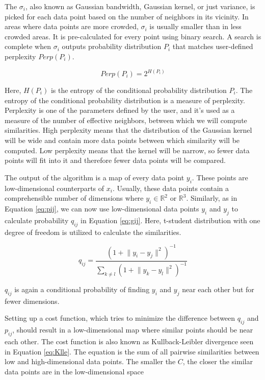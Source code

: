 The $\sigma_i$, also known as Gaussian bandwidth, Gaussian kernel, or just variance, is picked for each data point based on the number of neighbors in its vicinity.
In areas where data points are more crowded, $\sigma_i$ is usually smaller than in less crowded areas.
It is pre-calculated for every point using binary search.
A search is complete when $\sigma_i$ outputs probability distribution $P_i$ that matches user-defined perplexity $Perp(P_i)$.

$$Perp(P_i) = 2^{H(P_i)}$$

Here, $H(P_i)$ is the entropy of the conditional probability distribution $P_i$.
The entropy of the conditional probability distribution is a measure of perplexity.
Perplexity is one of the parameters defined by the user, and it's used as a measure of the number of effective neighbors, between which we will compute similarities.
High perplexity means that the distribution of the Gaussian kernel will be wide and contain more data points between which similarity will be computed.
Low perplexity means that the kernel will be narrow, so fewer data points will fit into it and therefore fewer data points will be compared.

The output of the algorithm is a map of every data point $y_i$.
These points are low-dimensional counterparts of $x_i$.
Usually, these data points contain a comprehensible number of dimensions where $y_i \in \mathbb{R}^2$ or $\mathbb{R}^3$.
Similarly, as in Equation \ref{eq:pij}, we can now use low-dimensional data points $y_i$ and $y_j$ to calculate probability $q_{ij}$ in Equation \ref{eq:gij}.
Here, t-student distribution with one degree of freedom is utilized to calculate the similarities.

\begin{equation}
\label{eq:gij}
q_{ij} = \frac{(1+\lVert y_i - y_j \rVert^2)^{-1}}{\sum_{k \neq l} (1+\lVert y_k - y_l \rVert^2)^{-1}} 
\end{equation}

$q_{ij}$ is again a conditional probability of finding $y_i$ and $y_j$ near each other but for fewer dimensions.

Setting up a cost function, which tries to minimize the difference between $q_{ij}$ and $p_{ij}$, should result in a low-dimensional map where similar points should be near each other.
The cost function is also known as Kullback-Leibler divergence seen in Equation \ref{eq:Klle}.
The equation is the sum of all pairwise similarities between low and high-dimensional data points.
The smaller the $C$, the closer the similar data points are in the low-dimensional space


